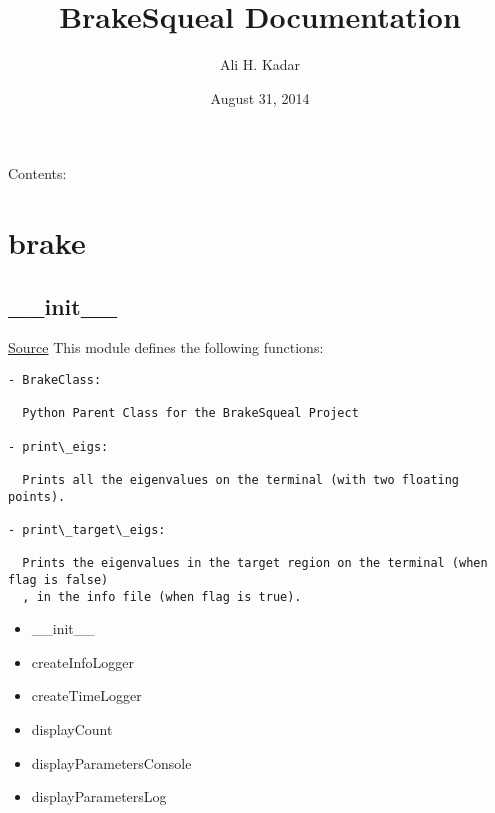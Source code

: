 \documentclass[letterpaper,10pt,english]{sphinxmanual}
\title{BrakeSqueal Documentation}
\date{August 31, 2014}
\author{Ali H. Kadar}
\begin{document}
\maketitle
\tableofcontents
{}\label{index::doc}


Contents:


\chapter{brake}
\label{index:brake}\label{index:welcome-to-brakesqueal-s-documentation}

\section{\_\_init\_\_}
\label{index:init}
\href{https://bitbucket.org/akadar/brakesqueal0.1/src/10fdbd0824e88ebbee4f44cefa781c01e586db41/brake/\_\_init\_\_.py?at=master}{Source}
\label{index:module-brake.__init__}
This module defines the following functions:

\begin{Verbatim}[commandchars=\\\{\}]
- BrakeClass:

  Python Parent Class for the BrakeSqueal Project
  
- print\_eigs:
  
  Prints all the eigenvalues on the terminal (with two floating points).
  
- print\_target\_eigs:

  Prints the eigenvalues in the target region on the terminal (when flag is false)
  , in the info file (when flag is true).
\end{Verbatim}

\begin{fulllineitems}
\label{index:brake.__init__.BrakeClass}
\begin{itemize}
\item {} 
\_\_init\_\_

\item {} 
createInfoLogger

\item {} 
createTimeLogger

\item {} 
displayCount

\item {} 
displayParametersConsole

\item {} 
displayParametersLog

\end{itemize}

\end{fulllineitems}
\end{document}
